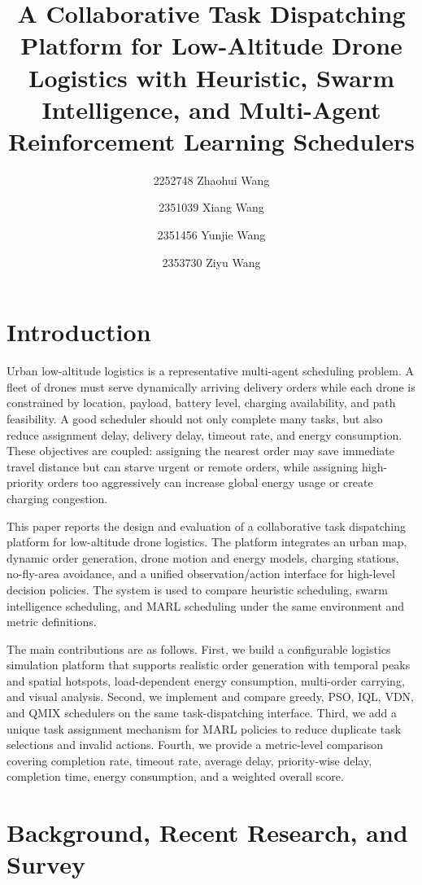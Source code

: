 \documentclass[sigconf,balance=false]{aamas}
\title[Low-Altitude Drone Logistics Scheduling]{A Collaborative Task Dispatching Platform for Low-Altitude Drone Logistics with Heuristic, Swarm Intelligence, and Multi-Agent Reinforcement Learning Schedulers}
\author{2252748 Zhaohui Wang}
\author{2351039 Xiang Wang}
\author{2351456 Yunjie Wang}
\author{2353730 Ziyu Wang}
\begin{document}
\pagestyle{fancy}
\fancyhead{}
\maketitle

\section{Introduction}

Urban low-altitude logistics is a representative multi-agent scheduling problem. A fleet of drones must serve dynamically arriving delivery orders while each drone is constrained by location, payload, battery level, charging availability, and path feasibility. A good scheduler should not only complete many tasks, but also reduce assignment delay, delivery delay, timeout rate, and energy consumption. These objectives are coupled: assigning the nearest order may save immediate travel distance but can starve urgent or remote orders, while assigning high-priority orders too aggressively can increase global energy usage or create charging congestion.

This paper reports the design and evaluation of a collaborative task dispatching platform for low-altitude drone logistics. The platform integrates an urban map, dynamic order generation, drone motion and energy models, charging stations, no-fly-area avoidance, and a unified observation/action interface for high-level decision policies. The system is used to compare heuristic scheduling, swarm intelligence scheduling, and MARL scheduling under the same environment and metric definitions.

The main contributions are as follows. First, we build a configurable logistics simulation platform that supports realistic order generation with temporal peaks and spatial hotspots, load-dependent energy consumption, multi-order carrying, and visual analysis. Second, we implement and compare greedy, PSO, IQL, VDN, and QMIX schedulers on the same task-dispatching interface. Third, we add a unique task assignment mechanism for MARL policies to reduce duplicate task selections and invalid actions. Fourth, we provide a metric-level comparison covering completion rate, timeout rate, average delay, priority-wise delay, completion time, energy consumption, and a weighted overall score.

\section{Background, Recent Research, and Survey}
\end{document}
